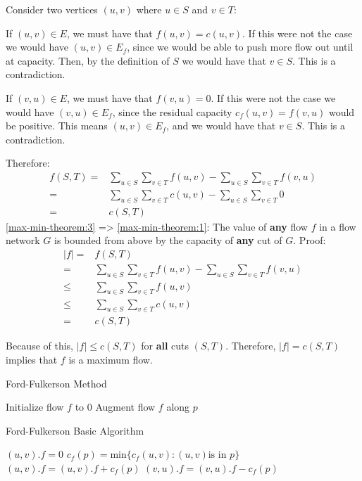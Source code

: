 Consider two vertices $(u,v)$ where $u\in S$ and $v\in T$:

If $(u,v)\in E$, we must have that $f(u,v) = c(u,v)$. If this were not the case we would have 
$(u,v)\in E_f$, since we would be able to push more flow out until at capacity. Then, by the definition 
of $S$ we would have that $v\in S$. This is a contradiction.

If $(v,u)\in E$, we must have that $f(v,u) = 0$. If this were not the case we would have
$(v,u)\in E_f$, since the residual capacity $c_f(u,v) = f(v,u)$ would be positive. This
means $(u,v)\in E_f$, and we would have that $v\in S$. This is a contradiction.

Therefore:
\begin{align*}
	f(S,T) =& 	\sum_{u\in S}\sum_{v\in T} f(u,v) -
				\sum_{u\in S}\sum_{v\in T} f(v,u) \\
		   =&	\sum_{u\in S}\sum_{v\in T} c(u,v) -
		   		\sum_{u\in S}\sum_{v\in T} 0 \\
		   =&	c(S,T)
\end{align*}
%
\ref{max-min-theorem:3} => \ref{max-min-theorem:1}:
%
The value of \textbf{any} flow $f$ in a flow network $G$
is bounded from above by the capacity of \textbf{any} cut
of $G$. Proof:
\begin{align*}
	|f| =& f(S,T) \\
		=& \sum_{u\in S}\sum_{v\in T} f(u,v) -
			\sum_{u\in S}\sum_{v\in T} f(v,u) \\
		\leq& \sum_{u\in S}\sum_{v\in T} f(u,v) \\
		\leq& \sum_{u\in S}\sum_{v\in T} c(u,v) \\
		=& c(S,T)
\end{align*}

Because of this, $|f| \leq c(S,T)$ for \textbf{all} cuts
$(S,T)$. Therefore, $|f| = c(S,T)$ implies that $f$ is
a maximum flow.

\begin{algorithm}
\caption{Ford-Fulkerson Method}
\begin{algorithmic}[1]
	\State Initialize flow $f$ to $0$
		\State Augment flow $f$ along $p$
	\EndWhile
\EndProcedure
\end{algorithmic}
\end{algorithm}

\begin{algorithm}
\caption{Ford-Fulkerson Basic Algorithm}
\begin{algorithmic}[1]
		\State $(u,v).f = 0$
	\EndFor
		\State $c_f(p) = \text{min}\{c_f(u,v) : (u,v) \text{is in $p$}\}$
				\State $(u,v).f = (u,v).f + c_f(p)$
			\Else
				\State $(v,u).f = (v,u).f - c_f(p)$
			\EndIf
		\EndFor
	\EndWhile
\EndProcedure
\end{algorithmic}
\end{algorithm}

